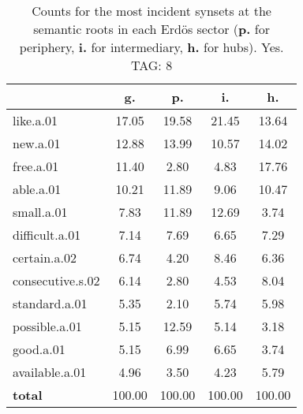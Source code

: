 \begin{table}[h!]
\begin{center}
\begin{tabular}{| l || c | c | c | c |}\hline
 & {\bf g.} & {\bf p.} & {\bf i.} & {\bf h.} \\\hline\hline
like.a.01 & 17.05  & 19.58  & 21.45  & 13.64 \\\hline
new.a.01 & 12.88  & 13.99  & 10.57  & 14.02 \\\hline
free.a.01 & 11.40  & 2.80  & 4.83  & 17.76 \\\hline
able.a.01 & 10.21  & 11.89  & 9.06  & 10.47 \\\hline
small.a.01 & 7.83  & 11.89  & 12.69  & 3.74 \\\hline
difficult.a.01 & 7.14  & 7.69  & 6.65  & 7.29 \\\hline
certain.a.02 & 6.74  & 4.20  & 8.46  & 6.36 \\\hline
consecutive.s.02 & 6.14  & 2.80  & 4.53  & 8.04 \\\hline
standard.a.01 & 5.35  & 2.10  & 5.74  & 5.98 \\\hline
possible.a.01 & 5.15  & 12.59  & 5.14  & 3.18 \\\hline
good.a.01 & 5.15  & 6.99  & 6.65  & 3.74 \\\hline
available.a.01 & 4.96  & 3.50  & 4.23  & 5.79 \\\hline\hline
{{\bf total}} & 100.00  & 100.00  & 100.00  & 100.00 \\\hline
\end{tabular}
\caption{Counts for the most incident synsets at the semantic roots in each Erd\"os sector ({\bf p.} for periphery, {\bf i.} for intermediary, {\bf h.} for hubs). Yes. TAG: 8}
\end{center}
\end{table}